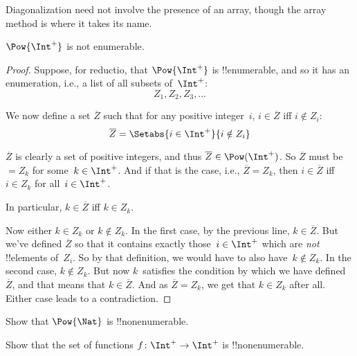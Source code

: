 \documentclass[../../include/open-logic-section]{subfiles}
\begin{document}
Diagonalization need not involve the presence of an array, though the
array method is where it takes its name.

\begin{thm}
$\Pow{\Int^+}$ is not enumerable.
\end{thm}

\begin{proof}
Suppose, for reductio, that $\Pow{\Int^+}$ is !!{enumerable}, and so
it has an enumeration, i.e., a list of all subsets of~$\Int^+$:
\[
Z_{1}, Z_{2}, Z_{3}, \dots
\]

We now define a set $\overline{Z}$ such that for any positive
integer~$i$, $i \in \overline{Z}$ iff $i \notin Z_{i}$:
\[
\overline{Z} = \Setabs{i \in \Int^+}{i \notin Z_i}
\]

$\overline{Z}$ is clearly a set of positive integers, and thus $\overline{Z}
\in \Pow(\Int^+)$. So $\overline{Z}$ must be $= Z_k$ for some~$k \in
\Int^+$.  And if that is the case, i.e., $\overline{Z} = Z_k$, then $i
\in \overline{Z}$ iff $i \in Z_k$ for all~$i \in \Int^+$.

In particular, $k \in \overline{Z}$ iff $k \in Z_k$.

Now either $k \in Z_{k}$ or $k \notin Z_{k}$. In the first case, by
the previous line, $k \in \overline{Z}$. But we've defined
$\overline{Z}$ so that it contains exactly those~$i \in \Int^+$ which
are \emph{not} !!{element}s of~$Z_i$. So by that definition, we would
have to also have~$k \notin Z_k$.  In the second case, $k \notin Z_k$.
But now $k$~satisfies the condition by which we have
defined~$\overline{Z}$, and that means that $k \in \overline{Z}$.  And
as $\overline{Z} = Z_k$, we get that $k \in Z_k$ after all.  Either
case leads to a contradiction.
\end{proof}

\begin{prob}
Show that $\Pow{\Nat}$ is !!{nonenumerable}.
\end{prob}

\begin{prob}
Show that the set of functions $f \colon \Int^+ \to \Int^+$ is
!!{nonenumerable}.
\end{prob}
\end{document}
